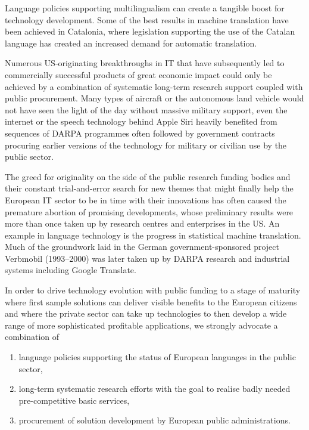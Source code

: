 \documentclass[10pt, plain]{../../metanetpaper}
\begin{document}
\begin{multicols}{2}
Language policies supporting multilingualism can create a tangible boost for technology development. Some of the best results in machine translation have been achieved in Catalonia, where legislation supporting the use of the Catalan language has created an increased demand for automatic translation. 

Numerous US-originating breakthroughs in IT that have subsequently led to commercially successful products of great economic impact could only be achieved by a combination of systematic long-term research support coupled with public procurement. Many types of aircraft or the autonomous land vehicle would not have seen the light of the day without massive military support, even the internet or the speech technology behind Apple Siri heavily benefited from sequences of DARPA programmes often followed by government contracts procuring earlier versions of the technology for military or civilian use by the public sector.

The greed for originality on the side of the public research funding bodies and their constant trial-and-error search for new themes that might finally help the European IT sector to be in time with their innovations has often caused the premature abortion of promising developments, whose preliminary results were more than once taken up by research centres and enterprises in the US. An example in language technology is the progress in statistical machine translation. Much of the groundwork laid in the German government-sponsored project Verbmobil (1993--2000) was later taken up by DARPA research and industrial systems including Google Translate. 

In order to drive technology evolution with public funding to a stage of maturity where first sample solutions can deliver visible benefits to the European citizens and where the private sector can take up technologies to then develop a wide range of more sophisticated profitable applications, we strongly advocate a combination of

\begin{enumerate}
\item language policies supporting the status of European languages in the public sector,
\item long-term systematic research efforts with the goal to realise badly needed pre-competitive basic services,
\item procurement of solution development by European public administrations. 
\end{enumerate}


\end{multicols}
\end{document}
